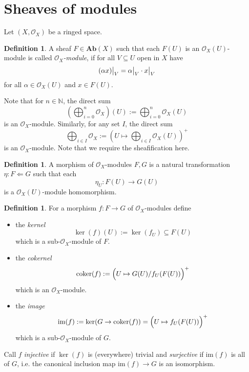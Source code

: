 \documentclass{scrartcl}
\newcommand{\N}{\mathbb{N}}
\newcommand{\Ab}{\mathrm{\textbf{Ab}}}
\newcommand{\im}{\mathrm{im}}
\renewcommand{\O}{\mathcal{O}}
\newcommand\restr[2]{{
    \left.\kern-\nulldelimiterspace
    #1
    \vphantom{\big|}
    \right|_{#2}
}}
\theoremstyle{definition}
\newtheorem{definition}[prop]{Definition}
\begin{document}
\section{Sheaves of modules}
Let $(X, \O_X)$ be a ringed space.
\begin{definition}
    A sheaf $F \in \Ab(X)$ such that each $F(U)$ is an $\O_X(U)$-module is called \emph{$\O_X$-module}, if for all $V \subseteq U$ open in $X$ have
    \begin{equation*}
        \restr{(\alpha x)}{V} = \restr{\alpha}{V} \cdot \restr{x}{V}
    \end{equation*}
    for all $\alpha \in \O_X(U)$ and $x \in F(U)$.
\end{definition}
Note that for $n \in \N$, the direct sum
\begin{equation*}
    \left( \bigoplus_{i = 0}^n \O_X \right)(U) := \bigoplus_{i = 0}^n \O_X(U)
\end{equation*}
is an $\O_X$-module.
Similarly, for any set $I$, the direct sum
\begin{equation*}
    \bigoplus_{i \in I} \O_X := \left( U \mapsto \bigoplus_{i \in I} \O_X(U) \right)^+
\end{equation*}
is an $\O_X$-module.
Note that we require the sheafification here.
\begin{definition}
    A morphism of $\O_X$-modules $F, G$ is a natural transformation $\eta: F \Leftarrow G$ such that each
    \begin{equation*}
        \eta_U: F(U) \to G(U)
    \end{equation*}
    is a $\O_X(U)$-module homomorphism.
\end{definition}
\begin{definition}
    For a morphism $f: F \to G$ of $\O_X$-modules define
    \begin{itemize}
        \item the \emph{kernel}
        \begin{equation*}
            \ker(f)(U) := \ker(f_U) \subseteq F(U)
        \end{equation*}
        which is a sub-$\O_X$-module of $F$.
        \item the \emph{cokernel}
        \begin{equation*}
            \mathrm{coker}(f) := \Bigl( U \mapsto G(U) / f_U(F(U)) \Bigr)^+
        \end{equation*}
        which is an $\O_X$-module.
        \item the \emph{image}
        \begin{equation*}
            \im(f) := \ker(G \to \mathrm{coker}(f)) = \Bigl( U \mapsto f_U(F(U)) \Bigr)^+
        \end{equation*}
        which is a sub-$\O_X$-module of $G$.
    \end{itemize}
    Call $f$ \emph{injective} if $\ker(f)$ is (everywhere) trivial and \emph{surjective} if $\im(f)$ is all of $G$, i.e. the canonical inclusion map $\im(f) \to G$ is an isomorphism.
\end{definition}
\end{document}
